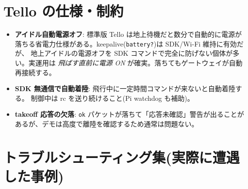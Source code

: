 \documentclass[11pt,a4paper]{ltjsarticle}
\newcommand{\code}[1]{\texttt{\small #1}}
\begin{document}
\section{Tello の仕様・制約}
\begin{itemize}[leftmargin=1.4em]
  \item \textbf{アイドル自動電源オフ}: 標準版 Tello は地上待機だと数分で自動的に電源が
        落ちる省電力仕様がある。keepalive(\code{battery?})は SDK/Wi-Fi 維持に有効だが、
        地上アイドルの電源オフを SDK コマンドで完全に防げない個体が多い。実運用は
        \emph{飛ばす直前に電源 ON} が確実。落ちてもゲートウェイが自動再接続する。
  \item \textbf{SDK 無通信で自動着陸}: 飛行中に一定時間コマンドが来ないと自動着陸する。
        制御中は rc を送り続けること(Pi watchdog も補助)。
  \item \textbf{takeoff 応答の欠落}: \code{ok} パケットが落ちて「応答未確認」警告が出ることが
        あるが、デモは高度で離陸を確認するため通常は問題ない。
\end{itemize}

\section{トラブルシューティング集(実際に遭遇した事例)}\label{sec:trouble}
\end{document}
